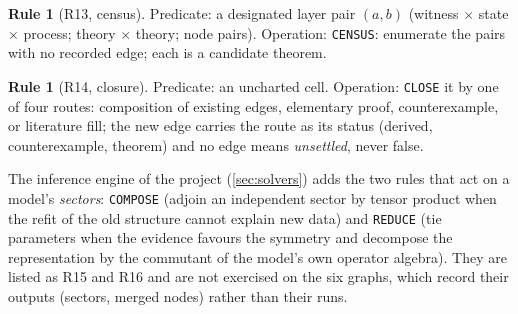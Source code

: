 \documentclass[11pt,a4paper,twoside,openany]{report}
\theoremstyle{plain}
\theoremstyle{definition}
\newtheorem{rule_}[theorem]{Rule}
\theoremstyle{remark}
\newcommand{\op}[1]{\texttt{\MakeUppercase{#1}}}
\begin{document}
\begin{rule_}[R13, census]
Predicate: a designated layer pair $(a,b)$ (witness $\times$ state $\times$ process; theory $\times$ theory; node pairs). Operation: \op{census}: enumerate the pairs with no recorded edge; each is a candidate theorem.
\end{rule_}
\begin{rule_}[R14, closure]
Predicate: an uncharted cell. Operation: \op{close} it by one of four routes: composition of existing edges, elementary proof, counterexample, or literature fill; the new edge carries the route as its status (derived, counterexample, theorem) and no edge means \emph{unsettled}, never false.
\end{rule_}
The inference engine of the project (\cref{sec:solvers}) adds the two rules that act on a model's \emph{sectors}: \op{compose} (adjoin an independent sector by tensor product when the refit of the old structure cannot explain new data) and \op{reduce} (tie parameters when the evidence favours the symmetry and decompose the representation by the commutant of the model's own operator algebra). They are listed as R15 and R16 and are not exercised on the six graphs, which record their outputs (sectors, merged nodes) rather than their runs.
\end{document}
